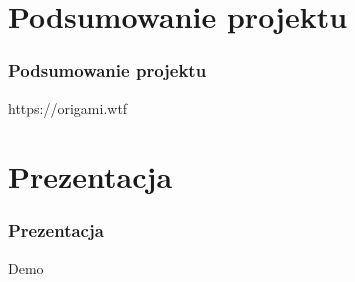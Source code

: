 \documentclass{beamer}
\begin{document}
\section{Podsumowanie projektu}
\begin{frame}
  \frametitle{Podsumowanie projektu}
  \centering
  \Huge{https://origami.wtf}
\end{frame}

\section{Prezentacja}
\begin{frame}
  \frametitle{Prezentacja}
  \centering
  \Huge{Demo}
\end{frame}
\end{document}
